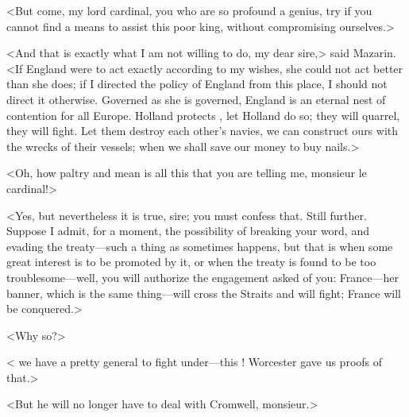 <But come, my lord cardinal, you who are so profound a genius, try if you cannot find a means to assist this poor king, without compromising ourselves.>

<And that is exactly what I am not willing to do, my dear sire,> said Mazarin. <If England were to act exactly according to my wishes, she could not act better than she does; if I directed the policy of England from this place, I should not direct it otherwise. Governed as she is governed, England is an eternal nest of contention for all Europe. Holland protects , let Holland do so; they will quarrel, they will fight. Let them destroy each other's navies, we can construct ours with the wrecks of their vessels; when we shall save our money to buy nails.>

<Oh, how paltry and mean is all this that you are telling me, monsieur le cardinal!>

<Yes, but nevertheless it is true, sire; you must confess that. Still further. Suppose I admit, for a moment, the possibility of breaking your word, and evading the treaty—such a thing as sometimes happens, but that is when some great interest is to be promoted by it, or when the treaty is found to be too troublesome—well, you will authorize the engagement asked of you: France—her banner, which is the same thing—will cross the Straits and will fight; France will be conquered.>

<Why so?>

< we have a pretty general to fight under—this \@! Worcester gave us proofs of that.>

<But he will no longer have to deal with Cromwell, monsieur.>

